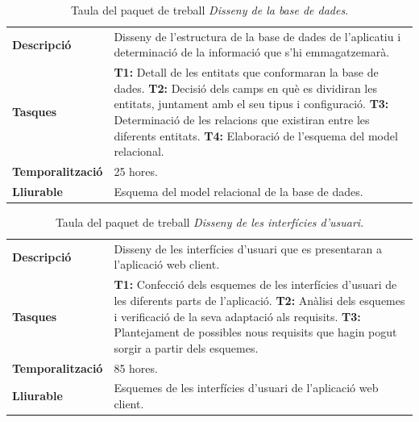 \documentclass[a4paper,12pt]{ThesisStyle}
\begin{document}
\begin{table}[H]
  \begin{tabularx}{\textwidth}{l | X}
    \toprule
    \rowcolor{Green}
    \multicolumn{2}{c}{\texttt{\textbf{PT\_2.2:}} Disseny de la base de dades}\\
    \midrule[0.9pt]
    \textbf{Descripció}       & Disseny de l'estructura de la base de dades de l'aplicatiu i determinació de la informació que s'hi emmagatzemarà.\\
    \midrule
    \textbf{Tasques}          & \textbf{T1:} Detall de les entitats que conformaran la base de dades.
    \newline \textbf{T2:} Decisió dels camps en què es dividiran les entitats, juntament amb el seu tipus i configuració.
    \newline \textbf{T3:} Determinació de les relacions que existiran entre les diferents entitats.
    \newline \textbf{T4:} Elaboració de l'esquema del model relacional.\\
    \midrule
    \textbf{Temporalització}  & 25 hores.\\
    \midrule
    \textbf{Lliurable}        & Esquema del model relacional de la base de dades.\\
    \bottomrule
  \end{tabularx}
  \caption{\label{taula:pt_2.2} Taula del paquet de treball \emph{Disseny de la base de dades}.}
\end{table}

\begin{table}[H]
  \begin{tabularx}{\textwidth}{l | X}
    \toprule
    \rowcolor{Green}
    \multicolumn{2}{c}{\texttt{\textbf{PT\_2.3:}} Disseny de les interfícies d'usuari}\\
    \midrule[0.9pt]
    \textbf{Descripció}       & Disseny de les interfícies d'usuari que es presentaran a l'aplicació web client.\\
    \midrule
    \textbf{Tasques}          & \textbf{T1:} Confecció dels esquemes de les interfícies d'usuari de les diferents parts de l'aplicació.
    \newline \textbf{T2:} Anàlisi dels esquemes i verificació de la seva adaptació als requisits.
    \newline \textbf{T3:} Plantejament de possibles nous requisits que hagin pogut sorgir a partir dels esquemes.\\
    \midrule
    \textbf{Temporalització}  & 85 hores.\\
    \midrule
    \textbf{Lliurable}        & Esquemes de les interfícies d'usuari de l'aplicació web client.\\
    \bottomrule
  \end{tabularx}
  \caption{\label{taula:pt_2.3} Taula del paquet de treball \emph{Disseny de les interfícies d'usuari}.}
\end{table}
\end{document}

